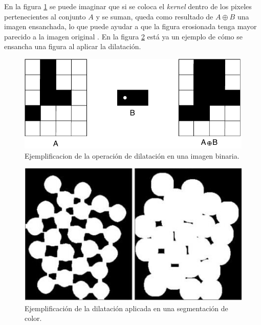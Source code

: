 En la figura \ref{fig:dilation_diagram} se puede imaginar que si se coloca el \textit{kernel} dentro de los pixeles pertenecientes al conjunto $A$ y se suman, queda como resultado de $A \oplus B$ una imagen ensanchada, lo que puede ayudar a que la figura erosionada tenga mayor parecido a la imagen original \cite{4767941}. En la figura \ref{fig:dilation_example} está ya un ejemplo de cómo se ensancha una figura al aplicar la dilatación.

\begin{figure}
\centering
\includegraphics[scale=1]{images/dilation_diagram.pdf}
\caption{Ejemplificacion de la operación de dilatación en una imagen binaria.}
\label{fig:dilation_diagram}
\end{figure}

\begin{figure}
\centering
\includegraphics[scale=0.7]{images/dilation_example.jpg}
\caption{Ejemplificación de la dilatación aplicada en una segmentación de color.}
\label{fig:dilation_example}
\end{figure}